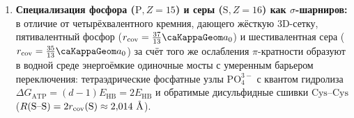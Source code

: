 \begin{theorem}
\begin{enumerate}[leftmargin=*,noitemsep]
\begin{equation}
    = \left(\frac{27}{39}\right)^{\!2}
    = \left(\frac{9}{13}\right)^{\!2}
    = \frac{81}{169} \approx 0{,}479 < \frac{1}{2}.
  \end{equation}
  Более чем двукратное падение энергии $\pi$-связи делает две одинарные $\sigma$-связи вдоль вершин тетраэдра~$K_4$ энергетически выгоднее одной двойной связи ($2\,E_\sigma(\text{Si--O}) > E_{\sigma+\pi}(\text{Si=O})$), вследствие чего кремний вместо летучего мономера образует твёрдую трёхмерную тетраэдрическую решётку кварца~$\text{SiO}_2$ и исключается из плоского информационного остова $\{111\}$.
\item \textbf{Специализация фосфора ($\text{P}, Z=15$) и серы ($\text{S}, Z=16$) как $\sigma$-шарниров:}
  в отличие от четырёхвалентного кремния, дающего жёсткую $3\mathrm{D}$-сетку, пятивалентный фосфор ($r_{\mathrm{cov}} = \frac{37}{13}\caKappaGeom a_0$) и шестивалентная сера ($r_{\mathrm{cov}} = \frac{35}{13}\caKappaGeom a_0$) за счёт того же ослабления $\pi$-кратности образуют в водной среде энергоёмкие одиночные мосты с умеренным барьером переключения: тетраэдрические фосфатные узлы $\text{PO}_4^{3-}$ с квантом гидролиза $\Delta G_{\mathrm{ATP}} = (d-1)E_{\mathrm{HB}} = 2E_{\mathrm{HB}}$ и обратимые дисульфидные сшивки $\text{Cys--Cys}$ ($R(\text{S--S}) = 2r_{\mathrm{cov}}(\text{S}) \approx 2{,}014\ \text{\normalfont\AA}$).
\end{enumerate}
\end{theorem}

